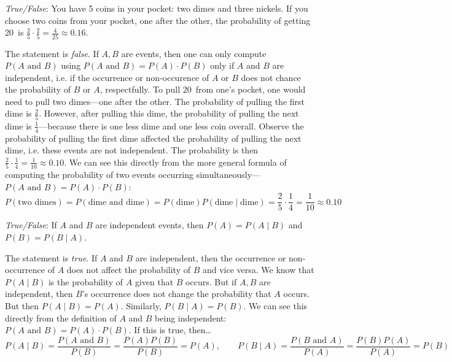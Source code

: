 \documentclass[11pt,letterpaper]{article}
\begin{document}
\quizsol \textit{True/False}: You have 5 coins in your pocket: two dimes and three nickels. If you choose two coins from your pocket, one after the other, the probability of getting 20\textcent\ is $\frac{2}{5} \cdot \frac{2}{5}= \frac{4}{25} \approx 0.16$. \pspace

\sol The statement is \textit{false}. If $A, B$ are events, then one can only compute $P(A \text{ and } B)$ using $P(A \text{ and } B)= P(A) \cdot P(B)$ only if $A$ and $B$ are independent, i.e. if the occurrence or non-occurence of $A$ or $B$ does not chance the probability of $B$ or $A$, respectfully. To pull 20\textcent\ from one's pocket, one would need to pull two dimes---one after the other. The probability of pulling the first dime is $\frac{2}{5}$. However, after pulling this dime, the probability of pulling the next dime is $\frac{1}{4}$---because there is one less dime and one less coin overall. Observe the probability of pulling the first dime affected the probability of pulling the next dime, i.e. these events are not independent. The probability is then $\frac{2}{5} \cdot \frac{1}{4}= \frac{1}{10} \approx 0.10$. We can see this directly from the more general formula of computing the probability of two events occurring simultaneously---$P(A \text{ and } B)= P(A) \cdot P(B)$:
	\[
	P(\text{two dimes})= P(\text{dime and dime})= P(\text{dime}) P( \text{dime} \;|\; \text{dime})= \dfrac{2}{5} \cdot \dfrac{1}{4}= \dfrac{1}{10} \approx 0.10
	\] \pvspace{1.3cm}



\quizsol \textit{True/False}: If $A$ and $B$ are independent events, then $P(A)= P(A \;|\; B)$ and $P(B)= P(B \;|\; A)$. \pspace

\sol The statement is \textit{true}. If $A$ and $B$ are independent, then the occurrence or non-occurrence of $A$ does not affect the probability of $B$ and vice versa. We know that $P(A \;|\; B)$ is the probability of $A$ given that $B$ occurs. But if $A, B$ are independent, then $B$'s occurrence does not change the probability that $A$ occurs. But then $P(A \;|\; B)= P(A)$. Similarly, $P(B \;|\; A)= P(B)$. We can see this directly from the definition of $A$ and $B$ being independent: $P(A \text{ and } B)= P(A) \cdot P(B)$. If this is true, then\dots
	\[
	P(A \;|\; B)= \dfrac{P(A \text{ and } B)}{P(B)}= \dfrac{P(A) P(B)}{P(B)}= P(A), \qquad P(B \;|\; A)= \dfrac{P(B \text{ and } A)}{P(A)}= \dfrac{P(B) P(A)}{P(A)}= P(B)
	\]
\end{document}
